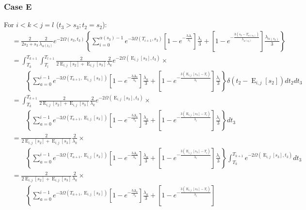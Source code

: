 \documentclass{article}
\DeclareMathOperator{\E}{E}
\begin{document}
\subsubsection{Case E}
For $i<k<j=l$ ($t_3>s_3; t_2=s_2$):
\begin{align*}
    &=\frac{2}{2s_2+s_3}\frac{2}{\lambda_{\alpha(t_3)}}e^{-2\Omega(s_3,t_3)}
    \left\{\sum_{i=0}^{\alpha(s_3)-1}e^{-3\Omega(T_{i+1},s_3)}
        \left[1-e^{-\frac{3\Delta_i}{\lambda_i}}\right]\frac{\lambda_i}{3}+
    \left[1-e^{-\frac{3\left(s_3-T_{\alpha(s_3)}\right)}{\lambda_{\alpha(s_3)}}}\right]
        \frac{\lambda_{\alpha(s_3)}}{3}\right\}\\
    &=\int_{T_k}^{T_{k+1}}\int_{T_l}^{T_{l+1}}
    \frac{2}{2\E_{i,j}[s_2]+\E_{i,j}[s_3]}\frac{2}{\lambda_{k}}e^{-2\Omega(\E_{i,j}[s_3],t_3)}\times\\
    &\qquad\left\{\sum_{a=0}^{i-1}e^{-3\Omega(T_{a+1},\E_{i,j}[s_3])}
    \left[1-e^{-\frac{3\Delta_a}{\lambda_a}}\right]\frac{\lambda_a}{3}+
    \left[1-e^{-\frac{3\left(\E_{i,j}[s_3]-T_{i}\right)}{\lambda_{i}}}\right]
    \frac{\lambda_{i}}{3}\right\}
    \delta(t_2-\E_{i,j}[s_2])dt_2dt_3\\
    &=\int_{T_k}^{T_{k+1}}
    \frac{2}{2\E_{i,j}[s_2]+\E_{i,j}[s_3]}\frac{2}{\lambda_{k}}e^{-2\Omega(\E_{i,j}[s_3],t_3)}\times\\
    &\qquad\left\{\sum_{a=0}^{i-1}e^{-3\Omega(T_{a+1},\E_{i,j}[s_3])}
    \left[1-e^{-\frac{3\Delta_a}{\lambda_a}}\right]\frac{\lambda_a}{3}+
    \left[1-e^{-\frac{3\left(\E_{i,j}[s_3]-T_{i}\right)}{\lambda_{i}}}\right]
    \frac{\lambda_{i}}{3}\right\}
    dt_3\\
    &=\frac{2}{2\E_{i,j}[s_2]+\E_{i,j}[s_3]}\frac{2}{\lambda_{k}}\times\\
    &\qquad\left\{\sum_{a=0}^{i-1}e^{-3\Omega(T_{a+1},\E_{i,j}[s_3])}
    \left[1-e^{-\frac{3\Delta_a}{\lambda_a}}\right]\frac{\lambda_a}{3}+
    \left[1-e^{-\frac{3\left(\E_{i,j}[s_3]-T_{i}\right)}{\lambda_{i}}}\right]
    \frac{\lambda_{i}}{3}\right\}
    \int_{T_k}^{T_{k+1}}e^{-2\Omega(\E_{i,j}[s_3],t_3)}dt_3\\
    &=\frac{2}{2\E_{i,j}[s_2]+\E_{i,j}[s_3]}\frac{2}{\lambda_{k}}\times\\
    &\qquad\left\{\sum_{a=0}^{i-1}e^{-3\Omega(T_{a+1},\E_{i,j}[s_3])}
    \left[1-e^{-\frac{3\Delta_a}{\lambda_a}}\right]\frac{\lambda_a}{3}+
    \left[1-e^{-\frac{3\left(\E_{i,j}[s_3]-T_{i}\right)}{\lambda_{i}}}\right]

\end{align*}
\end{document}
